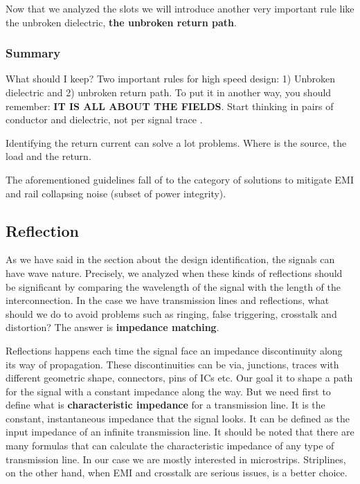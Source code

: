 \documentclass[final]{cubedoc}
\begin{document}
	Now that we analyzed the slots we will introduce another very important rule like the unbroken dielectric, \textbf{the unbroken return path}.
	
	
	\subsubsection{Summary}
	
	What should I keep? Two important rules for high speed design: 1) Unbroken dielectric and 2) unbroken return path.
	To put it in another way, you should remember: \textbf{IT IS ALL ABOUT THE FIELDS}. Start thinking in pairs of conductor and dielectric, not per signal trace \cite{morrison2002fields}.
	
	Identifying the return current can solve a lot problems. Where is the source, the load and the return.
	
	
	The aforementioned guidelines fall of to the category of solutions to mitigate EMI and rail collapsing noise (subset of power integrity).
	
	\subsection{Reflection}
	
	As we have said in the section about the design identification, the signals can have wave nature. Precisely, we analyzed when these kinds of reflections should be significant by comparing the wavelength of the signal with the length of the interconnection. In the case we have transmission lines and reflections, what should we do to avoid problems such as ringing, false triggering, crosstalk and distortion? The answer is \textbf{impedance matching}.
	
	Reflections happens each time the signal face an impedance discontinuity along its way of propagation. These discontinuities can be via, junctions, traces with different geometric shape, connectors, pins of ICs etc. Our goal it to shape a path for the signal with a constant impedance along the way. But we need first to define what is \textbf{characteristic impedance} for a transmission line. It is the constant, instantaneous impedance that the signal looks. It can be defined as the input impedance of an infinite transmission line. It should be noted that there are many formulas that can calculate the characteristic impedance of any type of transmission line. In our case we are mostly interested in microstrips. Striplines, on the other hand, when EMI and crosstalk are serious issues, is a better choice.
	
\end{document}

